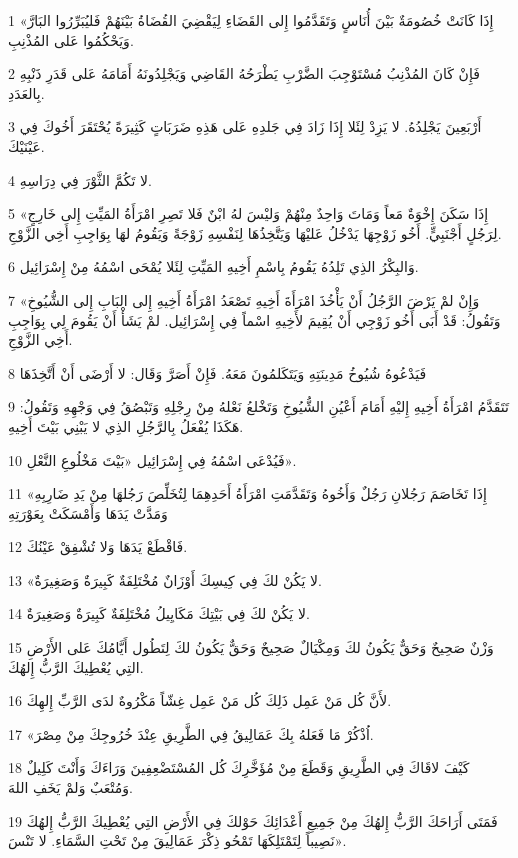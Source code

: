 \par 1 «إِذَا كَانَتْ خُصُومَةٌ بَيْنَ أُنَاسٍ وَتَقَدَّمُوا إِلى القَضَاءِ لِيَقْضِيَ القُضَاةُ بَيْنَهُمْ فَليُبَرِّرُوا البَارَّ وَيَحْكُمُوا عَلى المُذْنِبِ.
\par 2 فَإِنْ كَانَ المُذْنِبُ مُسْتَوْجِبَ الضَّرْبِ يَطْرَحُهُ القَاضِي وَيَجْلِدُونَهُ أَمَامَهُ عَلى قَدَرِ ذَنْبِهِ بِالعَدَدِ.
\par 3 أَرْبَعِينَ يَجْلِدُهُ. لا يَزِدْ لِئَلا إِذَا زَادَ فِي جَلدِهِ عَلى هَذِهِ ضَرَبَاتٍ كَثِيرَةً يُحْتَقَرَ أَخُوكَ فِي عَيْنَيْكَ.
\par 4 لا تَكُمَّ الثَّوْرَ فِي دِرَاسِهِ.
\par 5 «إِذَا سَكَنَ إِخْوَةٌ مَعاً وَمَاتَ وَاحِدٌ مِنْهُمْ وَليْسَ لهُ ابْنٌ فَلا تَصِرِ امْرَأَةُ المَيِّتِ إِلى خَارِجٍ لِرَجُلٍ أَجْنَبِيٍّ. أَخُو زَوْجِهَا يَدْخُلُ عَليْهَا وَيَتَّخِذُهَا لِنَفْسِهِ زَوْجَةً وَيَقُومُ لهَا بِوَاجِبِ أَخِي الزَّوْجِ.
\par 6 وَالبِكْرُ الذِي تَلِدُهُ يَقُومُ بِاسْمِ أَخِيهِ المَيِّتِ لِئَلا يُمْحَى اسْمُهُ مِنْ إِسْرَائِيل.
\par 7 «وَإِنْ لمْ يَرْضَ الرَّجُلُ أَنْ يَأْخُذَ امْرَأَةَ أَخِيهِ تَصْعَدُ امْرَأَةُ أَخِيهِ إِلى البَابِ إِلى الشُّيُوخِ وَتَقُولُ: قَدْ أَبَى أَخُو زَوْجِي أَنْ يُقِيمَ لأَخِيهِ اسْماً فِي إِسْرَائِيل. لمْ يَشَأْ أَنْ يَقُومَ لِي بِوَاجِبِ أَخِي الزَّوْجِ.
\par 8 فَيَدْعُوهُ شُيُوخُ مَدِينَتِهِ وَيَتَكَلمُونَ مَعَهُ. فَإِنْ أَصَرَّ وَقَال: لا أَرْضَى أَنْ أَتَّخِذَهَا
\par 9 تَتَقَدَّمُ امْرَأَةُ أَخِيهِ إِليْهِ أَمَامَ أَعْيُنِ الشُّيُوخِ وَتَخْلعُ نَعْلهُ مِنْ رِجْلِهِ وَتَبْصُقُ فِي وَجْهِهِ وَتَقُولُ: هَكَذَا يُفْعَلُ بِالرَّجُلِ الذِي لا يَبْنِي بَيْتَ أَخِيهِ.
\par 10 فَيُدْعَى اسْمُهُ فِي إِسْرَائِيل «بَيْتَ مَخْلُوعِ النَّعْلِ».
\par 11 «إِذَا تَخَاصَمَ رَجُلانِ رَجُلٌ وَأَخُوهُ وَتَقَدَّمَتِ امْرَأَةُ أَحَدِهِمَا لِتُخَلِّصَ رَجُلهَا مِنْ يَدِ ضَارِبِهِ وَمَدَّتْ يَدَهَا وَأَمْسَكَتْ بِعَوْرَتِهِ
\par 12 فَاقْطَعْ يَدَهَا وَلا تُشْفِقْ عَيْنُكَ.
\par 13 «لا يَكُنْ لكَ فِي كِيسِكَ أَوْزَانٌ مُخْتَلِفَةٌ كَبِيرَةٌ وَصَغِيرَةٌ.
\par 14 لا يَكُنْ لكَ فِي بَيْتِكَ مَكَايِيلُ مُخْتَلِفَةٌ كَبِيرَةٌ وَصَغِيرَةٌ.
\par 15 وَزْنٌ صَحِيحٌ وَحَقٌّ يَكُونُ لكَ وَمِكْيَالٌ صَحِيحٌ وَحَقٌّ يَكُونُ لكَ لِتَطُول أَيَّامُكَ عَلى الأَرْضِ التِي يُعْطِيكَ الرَّبُّ إِلهُكَ.
\par 16 لأَنَّ كُل مَنْ عَمِل ذَلِكَ كُل مَنْ عَمِل غِشّاً مَكْرُوهٌ لدَى الرَّبِّ إِلهِكَ.
\par 17 «اُذْكُرْ مَا فَعَلهُ بِكَ عَمَالِيقُ فِي الطَّرِيقِ عِنْدَ خُرُوجِكَ مِنْ مِصْرَ.
\par 18 كَيْفَ لاقَاكَ فِي الطَّرِيقِ وَقَطَعَ مِنْ مُؤَخَّرِكَ كُل المُسْتَضْعِفِينَ وَرَاءَكَ وَأَنْتَ كَلِيلٌ وَمُتْعَبٌ وَلمْ يَخَفِ اللهَ.
\par 19 فَمَتَى أَرَاحَكَ الرَّبُّ إِلهُكَ مِنْ جَمِيعِ أَعْدَائِكَ حَوْلكَ فِي الأَرْضِ التِي يُعْطِيكَ الرَّبُّ إِلهُكَ نَصِيباً لِتَمْتَلِكَهَا تَمْحُو ذِكْرَ عَمَالِيقَ مِنْ تَحْتِ السَّمَاءِ. لا تَنْسَ».

